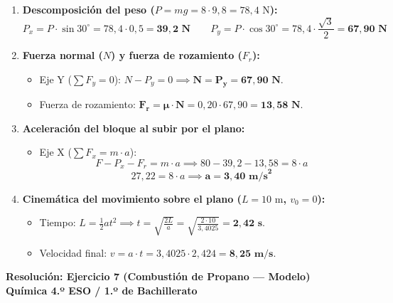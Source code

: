 ﻿\documentclass[11pt,a4paper]{article}
\begin{document}
\vspace{-0.1cm}
\begin{enumerate}[label=\textbf{\alph*)}, leftmargin=2em, itemsep=4pt]
    \item \textbf{Descomposición del peso ($P = mg = 8 \cdot 9{,}8 = 78{,}4\text{ N}$):}
    \[
    P_x = P \cdot \sin 30^\circ = 78{,}4 \cdot 0{,}5 = \mathbf{39{,}2\text{ N}} \qquad P_y = P \cdot \cos 30^\circ = 78{,}4 \cdot \frac{\sqrt{3}}{2} = \mathbf{67{,}90\text{ N}}
    \]

    \item \textbf{Fuerza normal ($N$) y fuerza de rozamiento ($F_r$):}
    \begin{itemize}[leftmargin=1.5em, itemsep=2pt]
        \item Eje Y ($\sum F_y = 0$): $N - P_y = 0 \implies \mathbf{N = P_y = 67{,}90\text{ N}}$.
        \item Fuerza de rozamiento: $\mathbf{F_r = \mu \cdot N} = 0{,}20 \cdot 67{,}90 = \mathbf{13{,}58\text{ N}}$.
    \end{itemize}

    \item \textbf{Aceleración del bloque al subir por el plano:}
    \begin{itemize}[leftmargin=1.5em, itemsep=2pt]
        \item Eje X ($\sum F_x = m \cdot a$):
        \[
        F - P_x - F_r = m \cdot a \implies 80 - 39{,}2 - 13{,}58 = 8 \cdot a
        \]
        \[
        27{,}22 = 8 \cdot a \implies \mathbf{a = 3{,}40\text{ m/s}^2}
        \]
    \end{itemize}

    \item \textbf{Cinemática del movimiento sobre el plano ($L = 10\text{ m}$, $v_0 = 0$):}
    \begin{itemize}[leftmargin=1.5em, itemsep=2pt]
        \item Tiempo: $L = \frac{1}{2}at^2 \implies t = \sqrt{\frac{2L}{a}} = \sqrt{\frac{2 \cdot 10}{3{,}4025}} = \mathbf{2{,}42\text{ s}}$.
        \item Velocidad final: $v = a \cdot t = 3{,}4025 \cdot 2{,}424 = \mathbf{8{,}25\text{ m/s}}$.
    \end{itemize}
\end{enumerate}

\newpage

\begin{center}
    {\LARGE \textbf{Resolución: Ejercicio 7 (Combustión de Propano — Modelo)}}\\[4pt]
    {\large \textbf{Química 4.º ESO / 1.º de Bachillerato}}
\end{center}
\end{document}
